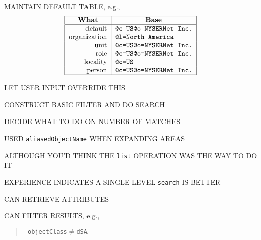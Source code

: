 \begin{bwslide}

\begin{nrtc}
\item	MAINTAIN DEFAULT TABLE, e.g.,
\[\begin{tabular}{|r|l|}
\hline
\multicolumn{1}{|c|}{\bf What}&
		\multicolumn{1}{|c|}{\bf Base}\\
\hline
default&	\tt @c=US@o=NYSERNet Inc.\\
organization&	\tt @l=North America\\
unit&		\tt @c=US@o=NYSERNet Inc.\\
role&		\tt @c=US@o=NYSERNet Inc.\\
locality&	\tt @c=US\\
person&		\tt @c=US@o=NYSERNet Inc.\\
\hline
\end{tabular}\]

\item	LET USER INPUT OVERRIDE THIS
    \begin{nrtc}
    \item	CONSTRUCT BASIC FILTER AND DO SEARCH

    \item	DECIDE WHAT TO DO ON NUMBER OF MATCHES

    \item	USED \verb"aliasedObjectName" WHEN EXPANDING AREAS
    \end{nrtc}
\end{nrtc}
\end{bwslide}


\begin{bwslide}

\begin{nrtc}
\item	ALTHOUGH YOU'D THINK THE \verb"list" OPERATION WAS THE WAY TO DO IT

\item	EXPERIENCE INDICATES A SINGLE-LEVEL \verb"search" IS BETTER
    \begin{nrtc}
    \item	CAN RETRIEVE ATTRIBUTES

    \item	CAN FILTER RESULTS, e.g.,
\begin{quote}\small\tt
objectClass$\neq$dSA
\end{quote}
    \end{nrtc}
\end{nrtc}
\end{bwslide}



